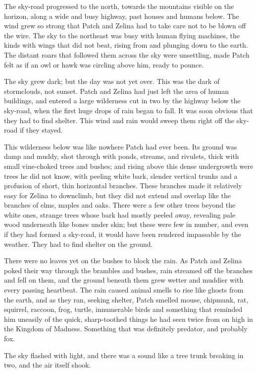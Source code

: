 \documentclass[12pt]{book}
\begin{document}
 The sky-road progressed to the north, towards the mountains visible on the horizon, along a wide and busy highway, past houses and humans below. The wind grew so strong that Patch and Zelina had to take care not to be blown off the wire. The sky to the northeast was busy with human flying machines, the kinds with wings that did not beat, rising from and plunging down to the earth. The distant roars that followed them across the sky were unsettling, made Patch felt as if an owl or hawk was circling above him, ready to pounce.\par
 The sky grew dark; but the day was not yet over. This was the dark of stormclouds, not sunset. Patch and Zelina had just left the area of human buildings, and entered a large wilderness cut in two by the highway below the sky-road, when the first huge drops of rain began to fall. It was soon obvious that they had to find shelter. This wind and rain would sweep them right off the sky-road if they stayed.\par
 This wilderness below was like nowhere Patch had ever been. Its ground was damp and muddy, shot through with ponds, streams, and rivulets, thick with small vine-choked trees and bushes; and rising above this dense undergrowth were trees he did not know, with peeling white bark, slender vertical trunks and a profusion of short, thin horizontal branches. These branches made it relatively easy for Zelina to downclimb, but they did not extend and overlap like the branches of elms, maples and oaks. There were a few other trees beyond the white ones, strange trees whose bark had mostly peeled away, revealing pale wood underneath like bones under skin; but these were few in number, and even if they had formed a sky-road, it would have been rendered impassable by the weather. They had to find shelter on the ground.\par
 There were no leaves yet on the bushes to block the rain. As Patch and Zelina poked their way through the brambles and bushes, rain streamed off the branches and fell on them, and the ground beneath them grew wetter and muddier with every passing heartbeat. The rain caused animal smells to rise like ghosts from the earth, and as they ran, seeking shelter, Patch smelled mouse, chipmunk, rat, squirrel, raccoon, frog, turtle, innumerable birds %
 and something that reminded him uneasily of the quick, sharp-toothed things he had seen twice from on high in the Kingdom of Madness. Something that was definitely predator, and probably fox.\par
 The sky flashed with light, and there was a sound like a tree trunk breaking in two, and the air itself shook.\par
\end{document}
